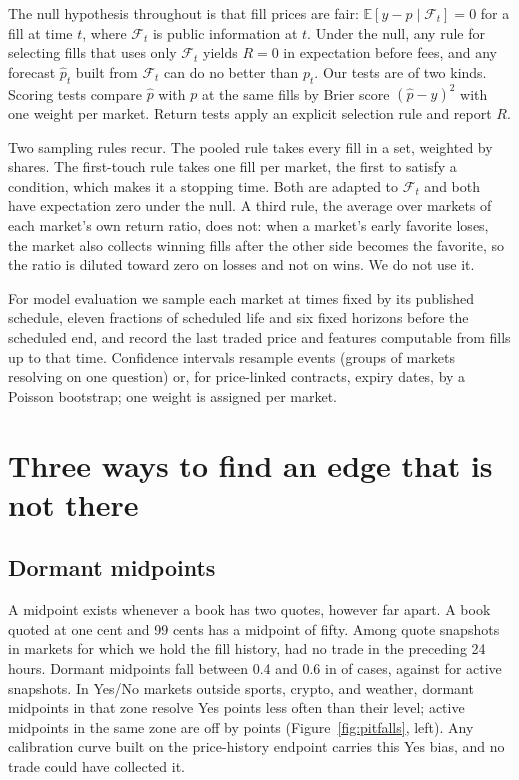 \documentclass[format=acmsmall, review=false]{acmart}
\begin{document}
The null hypothesis throughout is that fill prices are fair: $\mathbb{E}[y-p\mid \mathcal{F}_t]=0$ for a fill at time $t$, where $\mathcal{F}_t$ is public information at $t$. Under the null, any rule for selecting fills that uses only $\mathcal{F}_t$ yields $R=0$ in expectation before fees, and any forecast $\hat p_t$ built from $\mathcal{F}_t$ can do no better than $p_t$. Our tests are of two kinds. Scoring tests compare $\hat p$ with $p$ at the same fills by Brier score $(\hat p-y)^2$ with one weight per market. Return tests apply an explicit selection rule and report $R$.

Two sampling rules recur. The pooled rule takes every fill in a set, weighted by shares. The first-touch rule takes one fill per market, the first to satisfy a condition, which makes it a stopping time. Both are adapted to $\mathcal{F}_t$ and both have expectation zero under the null. A third rule, the average over markets of each market's own return ratio, does not: when a market's early favorite loses, the market also collects winning fills after the other side becomes the favorite, so the ratio is diluted toward zero on losses and not on wins. We do not use it.

For model evaluation we sample each market at times fixed by its published schedule, eleven fractions of scheduled life and six fixed horizons before the scheduled end, and record the last traded price and features computable from fills up to that time. Confidence intervals resample events (groups of markets resolving on one question) or, for price-linked contracts, expiry dates, by a Poisson bootstrap; one weight is assigned per market.

\section{Three ways to find an edge that is not there}\label{sec:pitfalls}

\subsection{Dormant midpoints}

A midpoint exists whenever a book has two quotes, however far apart. A book quoted at one cent and 99 cents has a midpoint of fifty. Among quote snapshots in markets for which we hold the fill history, \dormantShare{} had no trade in the preceding 24 hours. Dormant midpoints fall between 0.4 and 0.6 in \dormantZone{} of cases, against \activeZone{} for active snapshots. In Yes/No markets outside sports, crypto, and weather, dormant midpoints in that zone resolve Yes \dormantGap{} points less often than their level; active midpoints in the same zone are off by \activeGap{} points (Figure~\ref{fig:pitfalls}, left). Any calibration curve built on the price-history endpoint carries this Yes bias, and no trade could have collected it.
\end{document}

